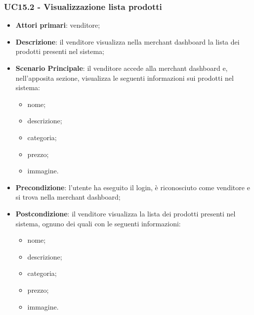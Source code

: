 \subsubsection{UC15.2 - Visualizzazione lista prodotti}
\begin{itemize}
\item \textbf{Attori primari}: venditore;
\item \textbf{Descrizione}: il venditore visualizza nella merchant dashboard la lista dei prodotti presenti nel sistema;
\item \textbf{Scenario Principale}: il venditore accede alla merchant dashboard e, nell'apposita sezione, visualizza le seguenti informazioni sui prodotti nel sistema:
\begin{itemize}
\item nome;
\item descrizione;
\item categoria;
\item prezzo;
\item immagine.
\end{itemize}
\item \textbf{Precondizione}: l'utente ha eseguito il login, è riconosciuto come venditore e si trova nella merchant dashboard;
\item \textbf{Postcondizione}: il venditore visualizza la lista dei prodotti presenti nel sistema, ognuno dei quali con le seguenti informazioni:
\begin{itemize}
\item nome;
\item descrizione;
\item categoria;
\item prezzo;
\item immagine.
\end{itemize}
\end{itemize}

